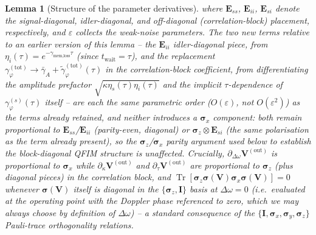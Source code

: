 \documentclass[journal]{IEEEtran}
\newtheorem{lemma}{Lemma}
\DeclareMathOperator{\Tr}{Tr}
\begin{document}
\begin{lemma}[Structure of the parameter derivatives]
where $\mathbf E_{ss}$, $\mathbf E_{ii}$, $\mathbf E_{si}$ denote the signal-diagonal, idler-diagonal, and off-diagonal (correlation-block) placement, respectively, and $\varepsilon$ collects the weak-noise parameters. The two new terms relative to an earlier version of this lemma -- the $\mathbf E_{ii}$ idler-diagonal piece, from $\eta_i(\tau)=e^{-\gamma_{\text{mem,loss}}\tau}$ (since $t_{\text{wait}}=\tau$), and the replacement $\gamma_\varphi^{(\text{tot})}\to\bar\gamma_A+\tilde\gamma_\varphi^{(\text{tot})}(\tau)$ in the correlation-block coefficient, from differentiating the amplitude prefactor $\sqrt{\kappa\eta_s(\tau)\eta_i(\tau)}$ and the implicit $\tau$-dependence of $\gamma_\varphi^{(s)}(\tau)$ itself -- are each the same parametric order ($O(\varepsilon)$, not $O(\varepsilon^2)$) as the terms already retained, and neither introduces a $\boldsymbol\sigma_x$ component: both remain proportional to $\mathbf E_{ss}$/$\mathbf E_{ii}$ (parity-even, diagonal) or $\boldsymbol\sigma_z\otimes\mathbf E_{si}$ (the same polarisation as the term already present), so the $\boldsymbol\sigma_z$/$\boldsymbol\sigma_x$ parity argument used below to establish the block-diagonal QFIM structure is unaffected. Crucially, $\partial_{\Delta\omega}\mathbf V^{(\text{out})}$ is proportional to $\boldsymbol\sigma_x$ while $\partial_\kappa\mathbf V^{(\text{out})}$ and $\partial_\tau\mathbf V^{(\text{out})}$ are proportional to $\boldsymbol\sigma_z$ (plus diagonal pieces) in the correlation block, and $\Tr[\boldsymbol\sigma_z\boldsymbol\sigma(\mathbf V)\boldsymbol\sigma_x\boldsymbol\sigma(\mathbf V)]=0$ whenever $\boldsymbol\sigma(\mathbf V)$ itself is diagonal in the $\{\boldsymbol\sigma_z,\mathbf I\}$ basis at $\Delta\omega=0$ (i.e.\ evaluated at the operating point with the Doppler phase referenced to zero, which we may always choose by definition of $\Delta\omega$) -- a standard consequence of the $\{\mathbf I,\boldsymbol\sigma_x,\boldsymbol\sigma_y,\boldsymbol\sigma_z\}$ Pauli-trace orthogonality relations.
\end{lemma}
\end{document}
